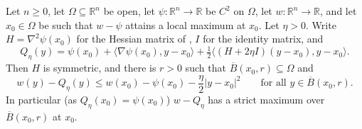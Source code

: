 \begin{lemma}
Let $n\ge0$, let $\Omega\subseteq\mathbb R^n$ be open, let $\psi:\mathbb R^n\to\mathbb R$ be $C^2$ on $\Omega$, let $w:\mathbb R^n\to\mathbb R$, and let $x_0\in\Omega$ be such that $w-\psi$ attains a local maximum at $x_0$. Let $\eta>0$. Write $H=\nabla^2\psi(x_0)$ for the Hessian matrix of , $I$ for the identity matrix, and
\[
Q_\eta(y)=\psi(x_0)+\langle\nabla\psi(x_0),y-x_0\rangle+\tfrac12\langle (H+2\eta I)(y-x_0),y-x_0\rangle .
\]
Then $H$ is symmetric, and there is $r>0$ such that $\overline B(x_0,r)\subseteq\Omega$ and
\[
w(y)-Q_\eta(y)\le w(x_0)-\psi(x_0)-\frac\eta2|y-x_0|^2\qquad\text{for all }y\in\overline B(x_0,r).
\]
In particular (as $Q_\eta(x_0)=\psi(x_0)$) $w-Q_\eta$ has a strict maximum over $\overline B(x_0,r)$ at $x_0$.
\end{lemma}

